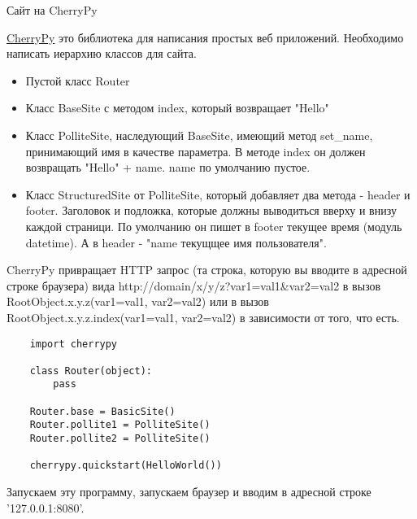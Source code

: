 \documentclass{article}
\begin{document}
\begin{center}Сайт на CherryPy\end{center}
\href{http://www.cherrypy.org/}{CherryPy} это библиотека для написания простых веб приложений.
Необходимо написать иерархию классов для сайта. 
\begin{itemize}
    \item Пустой класс Router
    \item Класс BaseSite с методом index, который возвращает "Hello"
    \item Класс PolliteSite, наследующий BaseSite, имеющий метод set\_name,
            принимающий имя в качестве параметра.
            В методе index он должен возвращать "Hello" + name. name по умолчанию пустое.
    \item Класс StructuredSite от PolliteSite, который добавляет два метода - header и footer.
          Заголовок и подложка, которые должны выводиться вверху и внизу каждой страници.
          По умолчанию он пишет в footer текущее время (модуль datetime). А в header - 
          "name {текущщее имя пользователя}".

\end{itemize}

CherryPy привращает HTTP запрос (та строка, которую вы вводите в адресной строке браузера)
вида http://domain/x/y/z?var1=val1\&var2=val2
в вызов RootObject.x.y.z(var1=val1, var2=val2) или в вызов \\
RootObject.x.y.z.index(var1=val1, var2=val2) в зависимости от того, что есть.

\begin{lstlisting}
    import cherrypy

    class Router(object):
        pass

    Router.base = BasicSite()
    Router.pollite1 = PolliteSite()
    Router.pollite2 = PolliteSite()

    cherrypy.quickstart(HelloWorld())
\end{lstlisting}

Запускаем эту программу, запускаем браузер и вводим в адресной строке '127.0.0.1:8080'.

\newpage
\end{document}
